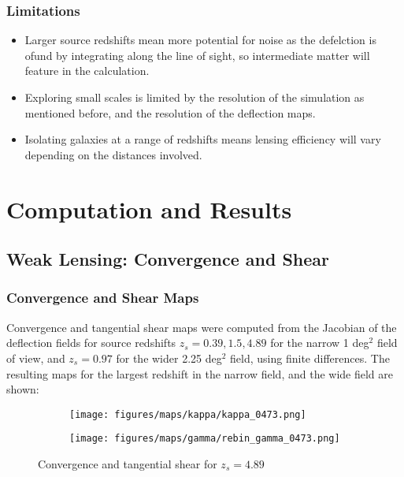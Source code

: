 \documentclass{beamer}
\begin{document}
  \begin{frame}
    \frametitle{\sc Limitations}
    \begin{itemize}
      \item Larger source redshifts mean more potential for noise as the defelction is ofund by integrating along the line of sight, so intermediate matter will feature in the calculation.
      \item Exploring small scales is limited by the resolution of the simulation as mentioned before, and the resolution of the deflection maps.
      \item Isolating galaxies at a range of redshifts means lensing efficiency will vary depending on the distances involved.
    \end{itemize}
  \end{frame}



  \section{Computation and Results}

  \subsection{Weak Lensing: Convergence and Shear}

  \begin{frame}
    \frametitle{\sc Convergence and Shear Maps}
    Convergence and tangential shear maps were computed from the Jacobian of the deflection fields for source redshifts $z_s = 0.39, 1.5, 4.89$ for the narrow 1 deg$^2$ field of view, and $z_s = 0.97$ for the wider 2.25 deg$^2$ field, using finite differences. The resulting maps for the largest redshift in the narrow field, and the wide field are shown:
  \end{frame}

  \begin{frame}
    \begin{figure}[H]
      \centering
      \begin{subfigure}{0.49\textwidth}
        \texttt{[image: figures/maps/kappa/kappa\_0473.png]}
      \end{subfigure}
      \hfill
      \begin{subfigure}{0.49\textwidth}
        \texttt{[image: figures/maps/gamma/rebin\_gamma\_0473.png]}
      \end{subfigure}
      \hfill
      \caption{Convergence and tangential shear for $z_s = 4.89$}
      \label{fig:0473 kappa gamma}
    \end{figure}
  \end{frame}
\end{document}
